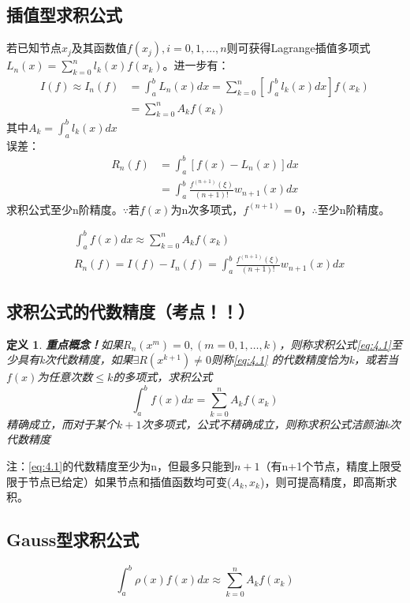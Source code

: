 \documentclass[a4paper]{article}
\newtheorem{definition}{定义}[section]
\begin{document}
\subsection{插值型求积公式}
若已知节点$x_j$及其函数值$f(x_j),i=0,1,\dots, n$则可获得Lagrange插值多项式$L_n(x)=\sum^n_{k=0}l_k(x)f(x_k)$。进一步有：
\begin{equation}
    \begin{split}
        I(f) \approx I_n(f) &= \int^b_aL_n(x)dx = \sum^n_{k=0}[\int^b_al_k(x)dx]f(x_k) \\
        &= \sum^n_{k=0}A_kf(x_k)
    \end{split}
\end{equation}
其中$A_k = \int^b_al_k(x)dx$\\
误差：
\begin{equation*}
    \begin{split}
        R_n(f)&=\int^b_a[f(x)-L_n(x)]dx \\
        &=\int^b_a\frac{f^{(n+1)}(\xi)}{(n+1)!}w_{n+1}(x)dx
    \end{split}
\end{equation*}
求积公式至少n阶精度。$\because $若$f(x)$为n次多项式，$f^{(n+1)}=0$，$\therefore $至少n阶精度。

\begin{align}
    &\int^b_a f(x)dx \approx \sum^n_{k=0}A_kf(x_k) \label{eq:4.1} \\
    &R_n(f) = I(f)-I_n(f) = \int^b_a\frac{f^{(n+1)}(\xi)}{(n+1)!}w_{n+1}(x)dx
\end{align}

\subsection{求积公式的代数精度\textbf{（考点！！）}}

\begin{definition}
    \textbf{重点概念！}如果$R_n(x^m)=0, (m=0,1,\dots, k)$，则称求积公式\ref{eq:4.1}至少具有k次代数精度，如果$\exists R(x^{k+1})\neq 0$则称\ref{eq:4.1}
    的代数精度恰为k，或若当$f(x)$为任意次数$\le k$的多项式，求积公式
    $$\int^b_af(x)dx = \sum^n_{k=0}A_kf(x_k)$$精确成立，而对于某个$k+1$次多项式，公式不精确成立，则称求积公式洁颜油k次代数精度
\end{definition}

注：\ref{eq:4.1}的代数精度至少为n，但最多只能到$n+1$（有n+1个节点，精度上限受限于节点已给定）如果节点和插值函数均可变($A_k, x_k$)，则可提高精度，即高斯求积。

\subsection{Gauss型求积公式}
\begin{equation}
    \int^b_a\rho(x)f(x)dx \approx \sum^n_{k=0}A_kf(x_k)
    \label{eq:4.2}
\end{equation}
\end{document}
